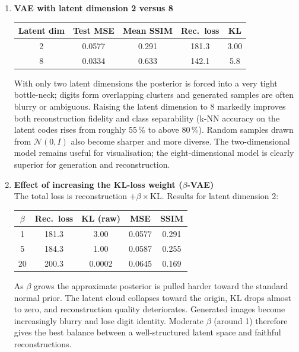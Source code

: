 \documentclass[10pt]{article}
\begin{document}
\begin{enumerate}
Both reconstructions look nearly identical; quantitative differences are negligible. Transposed convolutions introduce a few more parameters but do not yield a clear visual improvement on MNIST. For this data set the simpler UpSampling2D route is sufficient.\\

\item \textbf{VAE with latent dimension 2 versus 8}
\\[0.3em]
\begin{center}
\begin{tabular}{|c|c|c|c|c|}
\hline
Latent dim & Test MSE & Mean SSIM & Rec.\ loss & KL \\
\hline
2 & 0.0577 & 0.291 & 181.3 & 3.00 \\
8 & 0.0334 & 0.633 & 142.1 & 5.8 \\
\hline
\end{tabular}
\end{center}

With only two latent dimensions the posterior is forced into a very tight bottle-neck; digits form overlapping clusters and generated samples are often blurry or ambiguous. Raising the latent dimension to 8 markedly improves both reconstruction fidelity and class separability (k-NN accuracy on the latent codes rises from roughly 55\,\% to above 80\,\%). Random samples drawn from $\mathcal{N}(0,I)$ also become sharper and more diverse. The two-dimensional model remains useful for visualisation; the eight-dimensional model is clearly superior for generation and reconstruction.\\

\item \textbf{Effect of increasing the KL-loss weight ($\beta$-VAE)}
\\[0.3em]
The total loss is reconstruction $+\beta\times$KL. Results for latent dimension 2:

\begin{center}
\begin{tabular}{|c|c|c|c|c|}
\hline
$\beta$ & Rec.\ loss & KL (raw) & MSE & SSIM \\
\hline
1  & 181.3 & 3.00 & 0.0577 & 0.291 \\
5  & 184.3 & 1.00 & 0.0587 & 0.255 \\
20 & 200.3 & 0.0002 & 0.0645 & 0.169 \\
\hline
\end{tabular}
\end{center}

As $\beta$ grows the approximate posterior is pulled harder toward the standard normal prior. The latent cloud collapses toward the origin, KL drops almost to zero, and reconstruction quality deteriorates. Generated images become increasingly blurry and lose digit identity. Moderate $\beta$ (around 1) therefore gives the best balance between a well-structured latent space and faithful reconstructions.\\


\end{enumerate}
\end{document}
